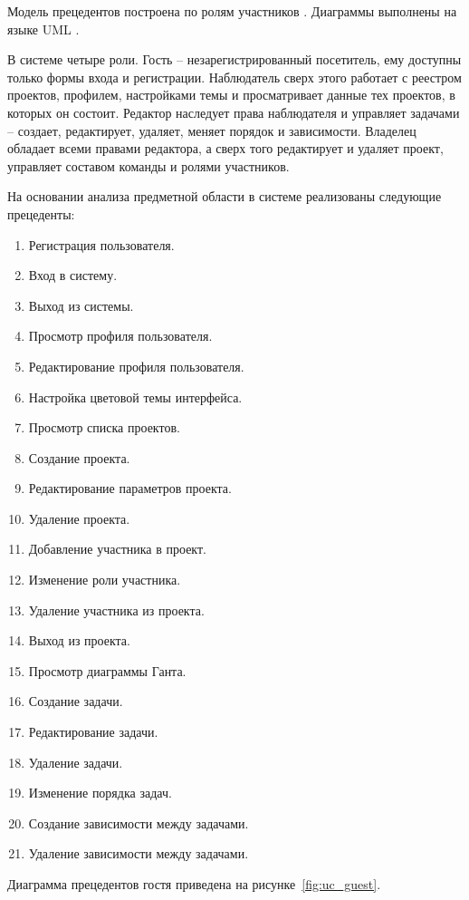 Модель прецедентов построена по ролям участников \cite{jacobson_rup}. Диаграммы выполнены на языке UML \cite{omg_uml}.

В системе четыре роли. Гость -- незарегистрированный посетитель, ему доступны только формы входа и регистрации. Наблюдатель сверх этого работает с реестром проектов, профилем, настройками темы и просматривает данные тех проектов, в которых он состоит. Редактор наследует права наблюдателя и управляет задачами -- создает, редактирует, удаляет, меняет порядок и зависимости. Владелец обладает всеми правами редактора, а сверх того редактирует и удаляет проект, управляет составом команды и ролями участников.

На основании анализа предметной области в системе реализованы следующие прецеденты:

\begin{enumerate}
    \item Регистрация пользователя.
    \item Вход в систему.
    \item Выход из системы.
    \item Просмотр профиля пользователя.
    \item Редактирование профиля пользователя.
    \item Настройка цветовой темы интерфейса.
    \item Просмотр списка проектов.
    \item Создание проекта.
    \item Редактирование параметров проекта.
    \item Удаление проекта.
    \item Добавление участника в проект.
    \item Изменение роли участника.
    \item Удаление участника из проекта.
    \item Выход из проекта.
    \item Просмотр диаграммы Ганта.
    \item Создание задачи.
    \item Редактирование задачи.
    \item Удаление задачи.
    \item Изменение порядка задач.
    \item Создание зависимости между задачами.
    \item Удаление зависимости между задачами.
\end{enumerate}

Диаграмма прецедентов гостя приведена на рисунке~\ref{fig:uc_guest}.

